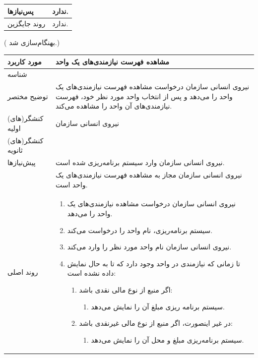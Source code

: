 \begin{table}[H]
\begin{tabular}{|p{3cm}|p{10cm}|}
		\hline
		پس‌نیازها & ندارد. \\
		\hline
		روند جایگزین & ندارد. \\
		\hline
	\end{tabular}
\end{table}

\newpage
({\color{red} بهنگام‌سازی شد.})
\begin{table}[H]
	\centering
	\begin{tabular}{|p{3cm}|p{10cm}|}
		\hline
		مورد کاربرد & مشاهده فهرست نیازمندی‌های یک واحد  \\
		\hline
		شناسه & 
		\stepcounter{usecase_ID}
		\arabic{usecase_ID} \\
		\hline
		توضیح مختصر & نیروی انسانی سازمان درخواست مشاهده فهرست نیازمندی‌های یک واحد را می‌دهد و پس از انتخاب واحد مورد نظر خود، فهرست نیازمندی‌های آن واحد را مشاهده می‌کند.\\
		\hline
		کنشگر(های) اولیه & نیروی انسانی سازمان \\
		\hline
		کنشگر(های) ثانویه &  \\
		\hline
		پیش‌نیازها & نیروی انسانی سازمان وارد سیستم برنامه‌ریزی شده است. \\
		& نیروی انسانی سازمان مجاز به مشاهده فهرست نیازمندی‌های یک واحد است. \\
		\hline
		
		روند اصلی &
		\begin{enumerate}[topsep=0cm,leftmargin=0.5cm]
			\item نیروی انسانی سازمان درخواست مشاهده نیازمندی‌های یک واحد را می‌دهد.
			\item سیستم برنامه‌ریزی، نام واحد را درخواست می‌کند.
			\item نیروی انسانی سازمان نام واحد مورد نظر را وارد می‌کند.
			\item تا زمانی که نیازمندی در واحد وجود دارد که تا به حال نمایش داده نشده است:
			\begin{enumerate}[topsep=0cm,leftmargin=0.5cm]
				
				\item اگر منبع از نوع مالی نقدی باشد:
				\begin{enumerate}[topsep=0cm,leftmargin=0.5cm]
					\item سیستم برنامه ریزی مبلغ آن را نمایش می‌دهد.
				\end{enumerate}
				\item در غیر اینصورت، اگر منبع از نوع مالی غیرنقدی باشد:
				\begin{enumerate}[topsep=0cm,leftmargin=0.5cm]
					\item سیستم برنامه‌ریزی مبلغ و محل آن را نمایش می‌دهد.
				\end{enumerate}
				

\end{enumerate}
\end{enumerate}
\end{tabular}
\end{table}
